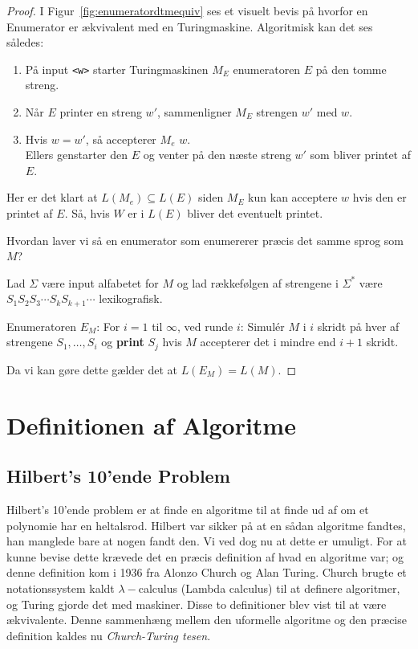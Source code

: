 \begin{proof}
I Figur~\ref{fig:enumeratordtmequiv} ses et visuelt bevis på hvorfor en Enumerator er ækvivalent med en Turingmaskine. Algoritmisk kan det ses således:
\begin{enumerate}
  \item På input \texttt{<w>} starter Turingmaskinen $M_{E}$ enumeratoren $E$ på den tomme streng.
  \item Når $E$ printer en streng $w'$, sammenligner $M_{E}$  strengen $w'$ med $w$.
  \item Hvis $w = w'$, så accepterer $M_{e}$ $w$. \\ \noindent Ellers genstarter den $E$ og venter på den næste streng $w'$ som bliver printet af $E$.
\end{enumerate}
Her er det klart at $L(M_{e}) \subseteq L(E)$ siden $M_{E}$  kun kan acceptere $w$ hvis den er printet af $E$. Så, hvis $W$ er i $L(E)$ bliver det eventuelt printet.

Hvordan laver vi så en enumerator som enumererer præcis det samme sprog som $M$?

Lad $\Sigma$ være input alfabetet for $M$ og lad rækkefølgen af strengene i $\Sigma^{*}$ være $S_{1}S_{2}S_{3} \cdots S_{k}S_{k+1} \cdots$ lexikografisk.

Enumeratoren $E_{M}$: For $i = 1$ til $\infty$, ved runde $i$: Simulér $M$  i $i$ skridt på hver af strengene $S_{1}, \ldots, S_{i}$ og \textbf{print} $S_{j}$ hvis $M$ accepterer det i mindre end $i+1$ skridt.

Da vi kan gøre dette gælder det at $L(E_{M}) = L(M)$.
\end{proof}

\section{Definitionen af Algoritme}%
\label{sec:definitionofalgorithm}

\subsection{Hilbert's 10'ende Problem}%
\label{subsec:hilberts10thproblem}

Hilbert's 10'ende problem er at finde en algoritme til at finde ud af om et polynomie har en heltalsrod. Hilbert var sikker på at en sådan algoritme fandtes, han manglede bare at nogen fandt den. Vi ved dog nu at dette er umuligt. For at kunne bevise dette krævede det en præcis definition af hvad en algoritme var; og denne definition kom i 1936 fra Alonzo Church og Alan Turing. Church brugte et notationssystem kaldt $\lambda-$calculus (Lambda calculus) til at definere algoritmer, og Turing gjorde det med maskiner. Disse to definitioner blev vist til at være ækvivalente. Denne sammenhæng mellem den uformelle algoritme og den præcise definition kaldes nu \textit{Church-Turing tesen}.

